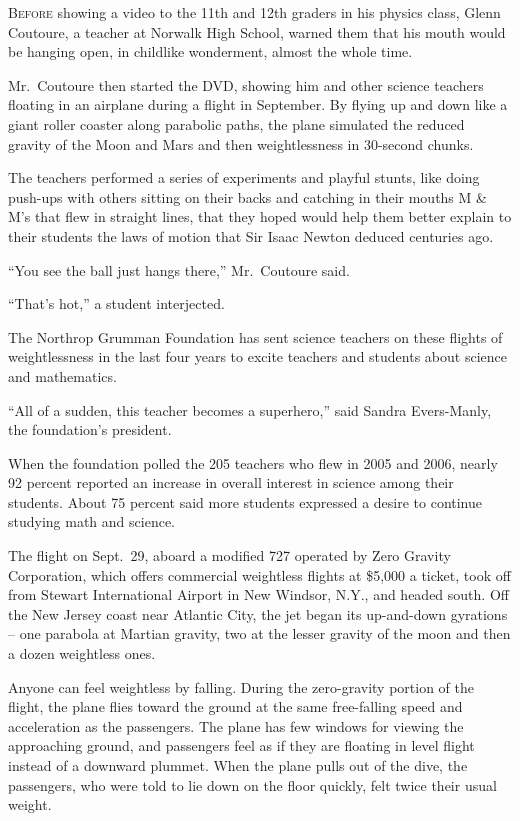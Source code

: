 ﻿\documentclass[12pt]{article}
\begin{document}
\lettrine{B}{efore} showing a video to the 11th and 12th graders in his
physics class, Glenn Coutoure, a teacher at Norwalk High School, warned them that his mouth would be
hanging open, in childlike wonderment, almost the whole time.

Mr.~Coutoure then started the DVD, showing him and other science teachers floating in an airplane
during a flight in September. By flying up and down like a giant roller coaster along parabolic
paths, the plane simulated the reduced gravity of the Moon and Mars and then weightlessness in
30-second chunks.

The teachers performed a series of experiments and playful stunts, like doing push-ups with others
sitting on their backs and catching in their mouths M \& M's that flew in straight lines, that they
hoped would help them better explain to their students the laws of motion that Sir Isaac Newton
deduced centuries ago.

``You see the ball just hangs there,'' Mr.~Coutoure said.

``That's hot,'' a student interjected.

The Northrop Grumman Foundation has sent science teachers on these flights of weightlessness in the
last four years to excite teachers and students about science and mathematics.

``All of a sudden, this teacher becomes a superhero,'' said Sandra Evers-Manly, the foundation's
president.

When the foundation polled the 205 teachers who flew in 2005 and 2006, nearly 92 percent reported an
increase in overall interest in science among their students. About 75 percent said more students
expressed a desire to continue studying math and science.

The flight on Sept.~29, aboard a modified 727 operated by Zero Gravity Corporation, which offers
commercial weightless flights at \$5,000 a ticket, took off from Stewart International Airport in
New Windsor, N.Y., and headed south. Off the New Jersey coast near Atlantic City, the jet began its
up-and-down gyrations -- one parabola at Martian gravity, two at the lesser gravity of the moon and
then a dozen weightless ones.

Anyone can feel weightless by falling. During the zero-gravity portion of the flight, the plane
flies toward the ground at the same free-falling speed and acceleration as the passengers. The plane
has few windows for viewing the approaching ground, and passengers feel as if they are floating in
level flight instead of a downward plummet. When the plane pulls out of the dive, the passengers,
who were told to lie down on the floor quickly, felt twice their usual weight.
\end{document}
